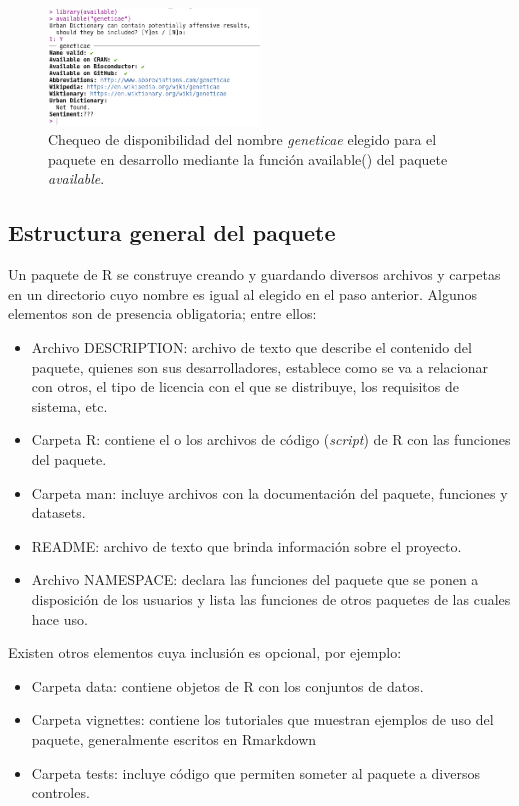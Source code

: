 \begin{figure}[h]
\begin{center}
	\includegraphics[width=0.50\textwidth]{./Graficos/available.png}	
\end{center}
	\caption{Chequeo de disponibilidad del nombre \emph{geneticae} elegido para el paquete en desarrollo mediante la función \textcolor{fandango}{available()} del paquete \emph{available}.}
\label{fig:fig31}
\end{figure}


\subsection{Estructura general del paquete}

Un paquete de R se construye creando y guardando diversos archivos y carpetas en un directorio cuyo nombre es igual al elegido en el paso anterior. Algunos elementos son de presencia obligatoria; entre ellos:

\begin{itemize}
\item Archivo DESCRIPTION: archivo de texto que describe el contenido del paquete, quienes son sus desarrolladores, establece como se va a relacionar con otros, el tipo de licencia con el que se distribuye, los requisitos de sistema, etc.
\item Carpeta R: contiene el o los archivos de código (\emph{script}) de R con las funciones del paquete.
\item Carpeta man: incluye archivos con la documentación del paquete, funciones y datasets.
\item README: archivo de texto que brinda información sobre el proyecto.
\item Archivo NAMESPACE: declara las funciones del paquete que se ponen a disposición de los usuarios y lista las funciones de otros paquetes de las cuales hace uso. 
\end{itemize}

Existen otros elementos cuya inclusión es opcional, por ejemplo:

\begin{itemize}
\item Carpeta data: contiene objetos de R con los conjuntos de datos.
\item Carpeta vignettes: contiene los tutoriales que muestran ejemplos de uso del paquete, generalmente escritos en Rmarkdown
\item Carpeta tests: incluye código que permiten someter al paquete a diversos controles.
\end{itemize}

